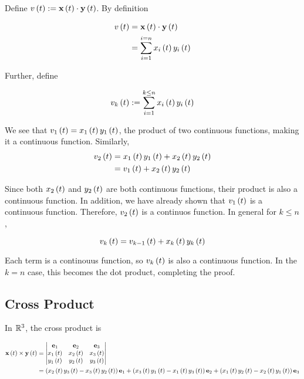 \documentclass{article}
\begin{document}
Define $v \left ( t \right) := \textbf{x} \left ( t \right) \cdot \textbf{y} \left ( t \right)$.
By definition

\begin{align*}
  v \left ( t \right) &= \textbf{x} \left ( t \right) \cdot \textbf{y} \left ( t \right) \\
             &= \sum \limits_{i=1}^{i=n} x_i \left ( t \right) y_i \left ( t \right) \\
\end{align*}

Further, define

$$
v_{k} \left ( t \right) := \sum \limits_{i=1}^{k \leq n} x_i \left ( t \right) y_i \left ( t \right)
$$

We see that $v_1 \left ( t \right) = x_1 \left ( t \right) y_1 \left ( t \right)$, the product of two continuous functions, making it a continuous function.
Similarly,
\begin{align*}
  v_2 \left ( t \right) &= x_1 \left ( t \right) y_1 \left ( t \right) + x_2 \left ( t \right) y_2 \left ( t \right) \\
               &= v_1 \left ( t \right) + x_2 \left ( t \right) y_2 \left ( t \right) \\
\end{align*}

Since both $x_2 \left ( t \right)$ and $y_2 \left ( t \right)$ are both continuous functions, their product is also a continuous function.
In addition, we have already shown that $v_1 \left ( t \right)$ is a continuous function.
Therefore, $v_2 \left ( t \right)$ is a continuos function.
In general for $k \leq n$,

$$
v_k \left ( t \right) = v_{k-1} \left ( t \right) + x_k \left ( t \right) y_k \left ( t \right)
$$

Each term is a continouus function, so $v_k \left ( t \right)$ is also a continuous function.
In the $k=n$ case, this becomes the dot product, completing the proof.



\subsection*{Cross Product}
In $\mathbb R^3$, the cross product is

\begin{align*}
  \textbf{x} \left ( t \right) \times \textbf{y} \left ( t \right) &=
                                           \begin{vmatrix}
                                             \textbf{e}_1 & \textbf{e}_2 & \textbf{e}_3 \\
                                             x_1 \left ( t \right) & x_2 \left ( t \right) & x_3 \left ( t \right) \\
                                             y_1 \left ( t \right) & y_2 \left ( t \right) & y_3 \left ( t \right) \\
                                           \end{vmatrix} \\
                                         &= \left ( x_2 \left ( t \right) y_3 \left ( t \right) - x_3 \left ( t \right) y_2 \left ( t \right) \right) \textbf{e}_1 + \left ( x_3 \left ( t \right) y_1 \left ( t \right) - x_1 \left ( t \right) y_3 \left ( t \right) \right) \textbf{e}_2 + \left ( x_1 \left ( t \right) y_2 \left ( t \right) - x_2 \left ( t \right) y_1 \left ( t \right) \right) \textbf{e}_3 \\
\end{align*}
\end{document}
